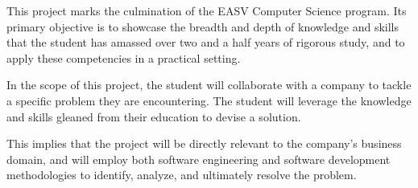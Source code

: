 



This project marks the culmination of the EASV Computer Science program. 
Its primary objective is to showcase the breadth and depth of knowledge 
and skills that the student has amassed over two and a half years of rigorous study,
and to apply these competencies in a practical setting.

In the scope of this project, the student will collaborate with a company 
to tackle a specific problem they are encountering.
The student will leverage the knowledge and skills gleaned from their education
to devise a solution.

This implies that the project will be directly relevant to the company's business domain,
and will employ both software engineering and software development methodologies
to identify, analyze, and ultimately resolve the problem.